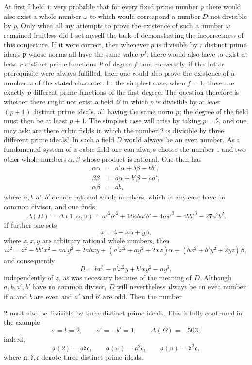 \documentclass[11pt]{article}
\newcommand{\origpage}[1]{\par\vspace{0.25em}\noindent{\footnotesize\itshape [Printed page #1]}\par\vspace{0.25em}}
\newcommand{\ideal}[1]{\mathfrak{#1}}
\begin{document}
\origpage{405}
At first I held it very probable that for every fixed prime number $p$ there would also exist a whole number $\omega$ to which would correspond a number $D$ not divisible by $p$. Only when all my attempts to prove the existence of such a number $\omega$ remained fruitless did I set myself the task of demonstrating the incorrectness of this conjecture. If it were correct, then whenever $p$ is divisible by $r$ distinct prime ideals $\ideal{p}$ whose norms all have the same value $p^f$, there would also have to exist at least $r$ distinct prime functions $P$ of degree $f$; and conversely, if this latter prerequisite were always fulfilled, then one could also prove the existence of a number $\omega$ of the stated character. In the simplest case, when $f=1$, there are exactly $p$ different prime functions of the first degree. The question therefore is whether there might not exist a field $\Omega$ in which $p$ is divisible by at least $(p+1)$ distinct prime ideals, all having the same norm $p$; the degree of the field must then be at least $p+1$. The simplest case will arise by taking $p=2$, and one may ask: are there cubic fields in which the number $2$ is divisible by three different prime ideals? In such a field $D$ would always be an even number. As a fundamental system of a cubic field one can always choose the number $1$ and two other whole numbers $\alpha,\beta$ whose product is rational. One then has
\[
\begin{aligned}
\alpha\alpha &= a'\alpha+b\beta-bb',\\
\beta\beta &= a\alpha+b'\beta-aa',\\
\alpha\beta &= ab,
\end{aligned}
\]
where $a,b,a',b'$ denote rational whole numbers, which in any case have no common divisor, and one finds
\[
\Delta(\Omega)=\Delta(1,\alpha,\beta)=a'^2b'^2+18aba'b'-4aa'^3-4bb'^3-27a^2b^2.
\]
If further one sets
\[
\omega=z+x\alpha+y\beta,
\]
where $z,x,y$ are arbitrary rational whole numbers, then
\[
\omega^2=z^2-bb'x^2-aa'y^2+2abxy+(a'x^2+ay^2+2xz)\alpha+(bx^2+b'y^2+2yz)\beta,
\]
and consequently
\[
D=bx^3-a'x^2y+b'xy^2-ay^3,
\]
independently of $z$, as was necessary because of the meaning of $D$. Although $a,b,a',b'$ have no common divisor, $D$ will nevertheless always be an even number if $a$ and $b$ are even and $a'$ and $b'$ are odd. Then the number

\origpage{406}
$2$ must also be divisible by three distinct prime ideals. This is fully confirmed in the example
\[
a=b=2,\qquad a'=-b'=1,\qquad \Delta(\Omega)=-503;
\]
indeed,
\[
\ideal{o}(2)=\ideal{a}\ideal{b}\ideal{c},\qquad \ideal{o}(\alpha)=\ideal{a}^2\ideal{c},\qquad \ideal{o}(\beta)=\ideal{b}^2\ideal{c},
\]
where $\ideal{a},\ideal{b},\ideal{c}$ denote three distinct prime ideals.
\end{document}
